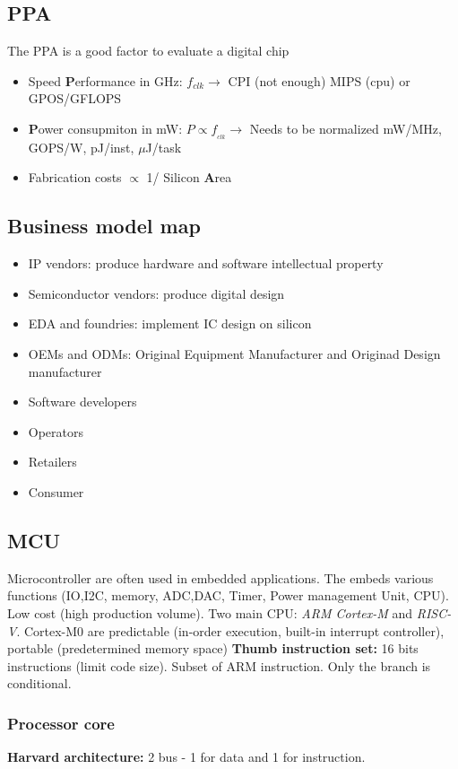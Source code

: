 \subsection{PPA}
The PPA is a good factor to evaluate a digital chip
\begin{itemize}
  \item Speed \textbf{P}erformance in GHz:
    \subitem \(f_{clk} \rightarrow\) CPI (not enough)
    \subitem MIPS (cpu) or GPOS/GFLOPS
  \item \textbf{P}ower consupmiton in mW:
    \subitem \(P \propto f_{_{clk}} \rightarrow\) Needs to be normalized
      \subitem mW/MHz, GOPS/W, pJ/inst, \(\mu\)J/task
    \item Fabrication costs \(\propto\) 1/ Silicon \textbf{A}rea
\end{itemize}

\subsection{Business model map}
\begin{itemize}
  \item IP vendors: produce hardware and software intellectual property
  \item Semiconductor vendors: produce digital design
  \item EDA and foundries: implement IC design on silicon
  \item OEMs and ODMs: Original Equipment Manufacturer and Originad Design manufacturer
  \item Software developers
  \item Operators
  \item Retailers
  \item Consumer
\end{itemize}

\subsection{MCU}
Microcontroller are often used in embedded applications. The embeds various functions (IO,I2C, memory, ADC,DAC, Timer, Power management Unit, CPU). Low cost (high production volume).
\bigbreak
Two main CPU: \textit{ARM Cortex-M} and \textit{RISC-V}. Cortex-M0 are predictable (in-order execution, built-in interrupt controller), portable (predetermined memory space)
\bigbreak
\textbf{Thumb instruction set:} 16 bits instructions (limit code size). Subset of ARM instruction. Only the branch is conditional.
\bigbreak
\subsubsection{Processor core}
\textbf{Harvard architecture:} 2 bus - 1 for data and 1 for instruction.

